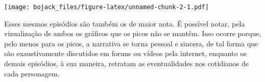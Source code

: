 \documentclass[
]{article}
\begin{document}
\texttt{[image: bojack\_files/figure-latex/unnamed-chunk-2-1.pdf]}

Esses mesmos episódios são também os de maior nota. É possível notar,
pela vizualização de ambos os gráficos que os picos não se mantêm. Isso
ocorre porque, pelo menos para os picos, a narrativa se torna pessoal e
sincera, de tal forma que são exaustivamente discutidos em foruns ou
vídeos pela internet, enquanto os demais episódios, à sua maneira,
retratam as eventualidades nos cotidianos de cada personagem.
\end{document}
